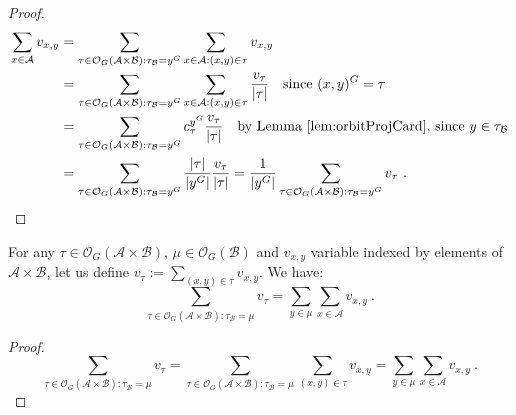 \begin{proof}
  \begin{equation}
    \begin{aligned}
      \sum_{x \in \mathcal{A}} v_{x,y} &= \sum_{\tau \in \mathcal{O}_G(\mathcal{A} \times \mathcal{B}):\tau_{\mathcal{B}}=y^G}\sum_{x \in \mathcal{A}:(x,y) \in \tau} v_{x,y}\\
      &= \sum_{\tau \in \mathcal{O}_G(\mathcal{A} \times \mathcal{B}):\tau_{\mathcal{B}}=y^G}\sum_{x \in \mathcal{A}:(x,y) \in \tau} \frac{v_{\tau}}{|\tau|} \quad \text{since } (x,y)^G=\tau\\
      &= \sum_{\tau \in \mathcal{O}_G(\mathcal{A} \times \mathcal{B}):\tau_{\mathcal{B}}=y^G} c^{y^G}_{\tau} \frac{v_{\tau}}{|\tau|} \quad \text{by Lemma~\ref{lem:orbitProjCard}, since } y \in \tau_{\mathcal{B}}\\
      &= \sum_{\tau \in \mathcal{O}_G(\mathcal{A} \times \mathcal{B}):\tau_{\mathcal{B}}=y^G} \frac{|\tau|}{|y^G|} \frac{v_{\tau}}{|\tau|} = \frac{1}{|y^G|}\sum_{\tau \in \mathcal{O}_G(\mathcal{A} \times \mathcal{B}): \tau_{\mathcal{B}}=y^G} v_{\tau} \ .
    \end{aligned}
  \end{equation}
\end{proof}

\begin{lemma}
  \label{lem:fromEleToOrbit}
  For any $\tau \in \mathcal{O}_G(\mathcal{A} \times \mathcal{B})$, $\mu \in \mathcal{O}_G(\mathcal{B})$ and $v_{x,y}$ variable indexed by elements of $\mathcal{A} \times \mathcal{B}$, let us define $v_{\tau} := \sum_{(x,y) \in \tau} v_{x,y}$. We have:
  \[ \sum_{\tau  \in \mathcal{O}_G(\mathcal{A} \times \mathcal{B}): \tau_{\mathcal{B}}=\mu} v_{\tau} = \sum_{y \in \mu} \sum_{x \in \mathcal{A}} v_{x,y} \ .\]
\end{lemma}

\begin{proof}
  \[ \sum_{\tau \in \mathcal{O}_G(\mathcal{A} \times \mathcal{B}):\tau_{\mathcal{B}}=\mu} v_{\tau} =  \sum_{\tau \in \mathcal{O}_G(\mathcal{A} \times \mathcal{B}):\tau_{\mathcal{B}}=\mu} \sum_{(x,y) \in \tau} v_{x,y} = \sum_{y \in \mu} \sum_{x \in \mathcal{A}} v_{x,y} \ . \]
\end{proof}

